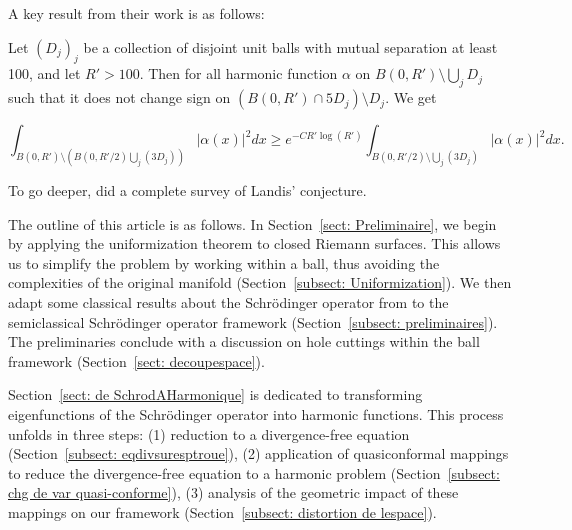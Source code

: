 \documentclass[leqno,11pt,letterpaper, english]{amsart}
\theoremstyle{plain}
\theoremstyle{definition}
\numberwithin{equation}{section}
\begin{document}

	A key result from their work is as follows:

	Let $(D_{j})_j$ be a collection of disjoint unit balls with mutual separation at least 100, and let $R'>100$. Then for all harmonic function  $\alpha$ on $B(0,R')\setminus\bigcup_j D_{j}$ such that it does not change sign on $(B(0,R')\cap 5D_{j})\setminus D_{j}$. We get

	\begin{equation}
		\int_{B(0,R')\setminus(B(0,R'/2)\bigcup_j(3D_{j}))} |\alpha(x)|^2dx\geq e^{-C R'\log(R')}\int_{B(0,R'/2)\setminus\bigcup_j(3D_{j}) }|\alpha(x)|^2dx.
	\end{equation}


	To go deeper, \cite*{fernandez-bertolinLandisConjectureSurvey2024} did a complete survey of Landis' conjecture. 

The outline of this article is as follows. In Section~\ref{sect: Preliminaire}, we begin by applying the uniformization theorem to closed Riemann surfaces. This allows us to simplify the problem by working within a ball, thus avoiding the complexities of the original manifold (Section~\ref{subsect: Uniformization}). We then adapt some classical results about the Schr\"odinger operator from \cite*{logunov2020landisconjectureexponentialdecay} to the semiclassical Schr\"odinger operator framework (Section~\ref{subsect: preliminaires}). The preliminaries conclude with a discussion on hole cuttings within the ball framework (Section~\ref{sect: decoupespace}).

Section~\ref{sect: de SchrodAHarmonique} is dedicated to transforming eigenfunctions of the Schr\"odinger operator into harmonic functions. This process unfolds in three steps: (1) reduction to a divergence-free equation (Section~\ref{subsect: eqdivsuresptroue}), (2) application of quasiconformal mappings to reduce the divergence-free equation to a harmonic problem (Section~\ref{subsect: chg de var quasi-conforme}), (3) analysis of the geometric impact of these mappings on our framework (Section~\ref{subsect: distortion de lespace}).
\end{document}
